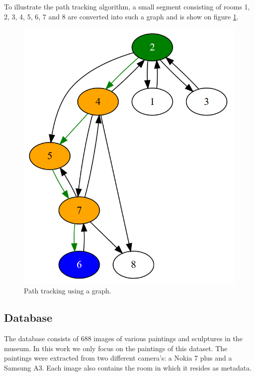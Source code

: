 \documentclass[10pt,final,journal]{IEEEtran}
\begin{document}
	
	
	
	To illustrate the path tracking algorithm,  a small segment consisting of rooms 1, 2, 3, 4, 5, 6, 7 and 8 are converted into such a graph and is show on figure \ref{fig:groundplan_msk_simple_graph}.
	
	

	\begin{figure}
		\includegraphics[width=\linewidth]{groundplan_msk_simple_graph}
		\caption{Path tracking using a graph. }
		\label{fig:groundplan_msk_simple_graph}
	\end{figure}
	
	\subsection{Database}
	The database consists of 688 images of various paintings and sculptures in the museum. In this work we only focus on the paintings of this dataset. The paintings were extracted from two different camera's: a Nokia 7 plus and a Samsung A3. Each image also contains the room in which it resides as metadata.  
	
\end{document}
